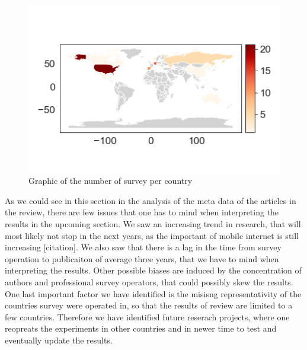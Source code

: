 \begin{figure}
    \centering
    \includegraphics[width=\textwidth]{reports/figures/surveys_per_country.png}
     \caption{Graphic of the number of survey per country}
    \label{fig: surveys_per_country}
\end{figure}


As we could see in this section in the analysis of the meta data of the articles in the review, there are few issues that one has to mind when interpreting the results in the upcoming section. We saw an increasing trend in research, that will most likely not stop in the next years, as the important of mobile internet is still increasing [citation]. We also saw that there is a lag in the time from survey operation to publicaiton of average three years, that we have to mind when interpreting the results. Other possible biases are induced by the concentration of authors and professional survey operators, that could possibly skew the results. One last important factor we have identified is the misisng representativity of the countries survey were operated in, so that the results of review are limited to a few countries. Therefore we have identified future reserach projects, where one reopreats the experiments in other countries and in newer time to test and eventually update the results. 






